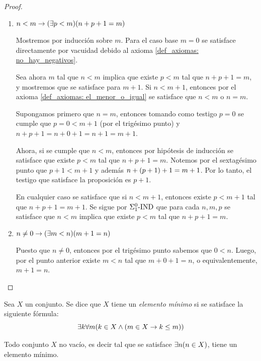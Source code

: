 \begin{proof}
\begin{enumerate}
		\item $n < m\to\pa*{\exists p < m}\pa*{n + p + 1 = m}$
		
		Mostremos por inducción sobre $m$. Para el caso base $m = 0$ se satisface directamente por vacuidad debido al axioma \ref{def_axiomas: no_hay_negativos}.

		Sea ahora $m$ tal que $n < m$ implica que existe $p < m$ tal que $n + p + 1 = m$, y mostremos que se satisface para $m + 1$. Si $n < m + 1$, entonces por el axioma \ref{def_axiomas: el_menor_o_igual} se satisface que $n < m$ o $n = m$.

		Supongamos primero que $n = m$, entonces tomando como testigo $p = 0$ se cumple que $p = 0 < m + 1$ (por el trigésimo punto) y $n + p + 1 = n + 0 + 1 = n + 1 = m + 1$.

		Ahora, si se cumple que $n < m$, entonces por hipótesis de inducción se satisface que existe $p < m$ tal que $n + p + 1 = m$. Notemos por el sextagésimo punto que $p + 1 < m + 1$ y además $n +\pa*{p + 1} + 1 = m + 1$. Por lo tanto, el testigo que satisface la proposición es $p + 1$.

		En cualquier caso se satisface que si $n < m + 1$, entonces existe $p < m + 1$ tal que $n + p + 1 = m + 1$. Se sigue por $\INDUCCION{\SIGMA{1}}$ que para cada $n, m,p$ se satisface que $n < m$ implica que existe $p < m$ tal que $n + p + 1 = m$.

		\item $n\neq 0\to\pa*{\exists m < n}\pa*{m + 1 = n}$
		
		Puesto que $n\neq 0$, entonces por el trigésimo punto sabemos que $0 < n$. Luego, por el punto anterior existe $m < n$ tal que $m + 0 + 1 = n$, o equivalentemente, $m + 1 = n$.
	\end{enumerate}
\end{proof}

\begin{definition}[Mínimo]
	Sea $X$ un conjunto. Se dice que $X$ tiene un \emph{elemento mínimo} si se satisface la siguiente fórmula:
	\[
		\exists k\forall m\pa*{k\in X\land\pa*{m\in X\to k\leq m}}
	\]
\end{definition}

\begin{theorem}
	Todo conjunto $X$ no vacío, es decir tal que se satisface $\exists n\pa*{n\in X}$, tiene un elemento mínimo.
\end{theorem}

